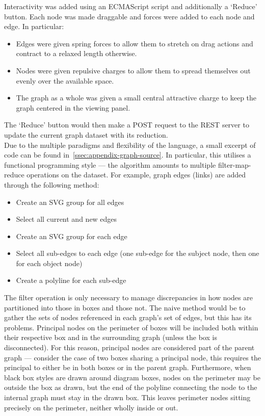         Interactivity was added using an ECMAScript script and additionally a `Reduce' button.
        Each node was made draggable and forces were added to each node and edge.
        In particular:
        \begin{itemize}
            \item Edges were given spring forces to allow them to stretch on drag actions and contract to a relaxed length otherwise.
            \item Nodes were given repulsive charges to allow them to spread themselves out evenly over the available space.
            \item The graph as a whole was given a small central attractive charge to keep the graph centered in the viewing panel.
        \end{itemize}
        The `Reduce' button would then make a POST request to the REST server to update the current graph dataset with its reduction.\\

        Due to the multiple paradigms and flexibility of the language, a small excerpt of code can be found in~\ref{ssec:appendix-graph-source}.
        In particular, this utilises a functional programming style --- the algorithm amounts to multiple filter-map-reduce operations on the dataset.
        For example, graph edges (links) are added through the following method:
        \begin{itemize}
            \item Create an SVG group for all edges
            \item Select all current and new edges
            \item Create an SVG group for each edge
            \item Select all sub-edges to each edge (one sub-edge for the subject node, then one for each object node)
            \item Create a polyline for each sub-edge
        \end{itemize}

        The filter operation is only necessary to manage discrepancies in how nodes are partitioned into those in boxes and those not.
        The naive method would be to gather the sets of nodes referenced in each graph's set of edges, but this has its problems.
        Principal nodes on the perimeter of boxes will be included both within their respective box and in the surrounding graph (unless the box is disconnected).
        For this reason, principal nodes are considered part of the parent graph --- consider the case of two boxes sharing a principal node, this requires the principal to either be in both boxes or in the parent graph.
        Furthermore, when black box styles are drawn around diagram boxes, nodes on the perimeter may be outside the box as drawn, but the end of the polyline connecting the node to the internal graph must stay in the drawn box.
        This leaves perimeter nodes sitting precisely on the perimeter, neither wholly inside or out.\\

